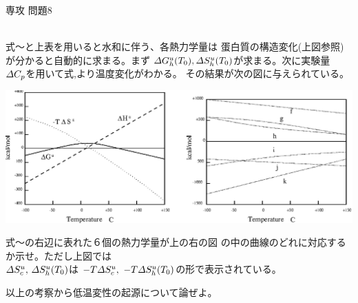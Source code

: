 \documentclass[fleqn]{jbook}
\begin{document}
\begin{question}{専攻 問題8}{}
\begin{subquestions}
{\begin{center}
  \end{center}}\\
%
  式〜と上表を用いると水和に伴う、各熱力学量は
  蛋白質の構造変化(上図参照)が分かると自動的に求まる。まず
  ${\mit\Delta} G^u_h (T_0),{\mit\Delta} S^u_h (T_0)$が求まる。次に実験量
  ${\mit\Delta} C_p $を用いて式,より温度変化がわかる。
  その結果が次の図に与えられている。
%
  \begin{center}
    \mbox{\includegraphics[clip]{1996phy8-2.eps}}
  \end{center}
%
  式〜の右辺に表れた６個の熱力学量が上の右の図
  の中の曲線のどれに対応するか示せ。ただし上図では\\
  ${\mit\Delta} S^u_c,\,{\mit\Delta} S^u_h (T_0)$は
  $-T {\mit\Delta} S^u_c,~-T {\mit\Delta} S^u_h (T_0)$の形で表示されている。

\SubQuestion
  以上の考察から低温変性の起源について論ぜよ。

\end{subquestions}

\end{question}
\end{document}
